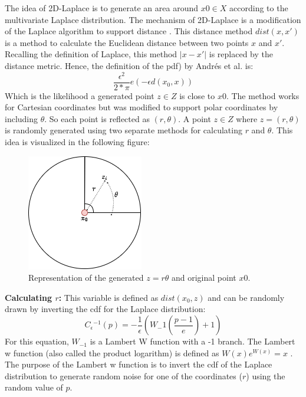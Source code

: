 The idea of 2D-Laplace is to generate an area around $x0 \in X$ according to the multivariate Laplace distribution.
The mechanism of 2D-Laplace is a modification of the Laplace algorithm to support distance \citep{DBLP:journals/corr/abs-1212-1984}.
This distance method $dist(x, x')$ is a method to calculate the Euclidean distance between two points $x$ and $x'$.
Recalling the definition of Laplace, this method $|x-x'|$ is replaced by the distance metric.
Hence, the definition of the \gls{pdf}) by Andrés et al. is:
\begin{equation}
  \frac{\epsilon^2}{2*\pi}e(-\epsilon d(x_0, x))
  \label{eq:polar-laplace-pdf}
\end{equation}
Which is the likelihood a generated point $z \in Z$ is close to $x0$.
The method works for Cartesian coordinates but was modified to support polar coordinates by including $\theta$.
So each point is reflected as $(r, \theta)$.
A point $z \in Z$ where $z = (r, \theta)$ is randomly generated using two separate methods for calculating $r$ and $\theta$.
This idea is visualized in the following figure:
\begin{figure}[H]
  \includegraphics[scale=0.6]{TheorethicalFramework/ND-Laplace/Images/polar-laplace.png}
  \centering
  \caption{Representation of the generated $z = {r \theta}$ and original point $x0$.}
  \label{figure:parea}
\end{figure}

\textbf{Calculating $r$:}
This variable is defined as $dist(x_0, z)$ and can be randomly drawn by inverting the \gls{cdf} for the Laplace distribution:
\begin{equation}
  C{_\epsilon}{^{-1}}(p) = - \frac{1}{\epsilon}(W_-1 (\frac{p - 1}{e}) + 1)
\end{equation}
For this equation, $W_{-1}$ is a Lambert W function with a -1 branch.
The Lambert w function (also called the product logarithm) is defined as $W(x)e^{W(x)} = x$ \citep{lehtonen_lambert_2016}.
The purpose of the Lambert w function is to invert the \gls{cdf} of the Laplace distribution to generate random noise for one of the coordinates ($r$) using the random value of $p$.

